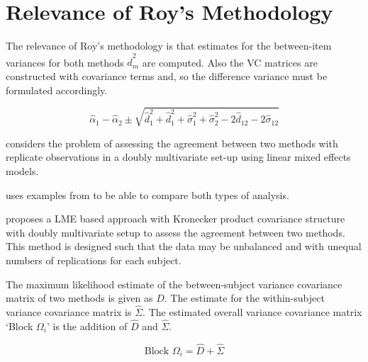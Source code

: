\documentclass[12pt, a4paper]{report}
\theoremstyle{plain}
\theoremstyle{definition}
\theoremstyle{remark}
\begin{document}










\section{Relevance of Roy's Methodology}

The relevance of Roy's methodology is that estimates for the between-item variances for both methods $\hat{d}^2_m$ are computed. Also the VC matrices are constructed with covariance
terms and, so the difference variance must be formulated accordingly.


\[
\hat{\alpha}_1 - \hat{\alpha}_2 \pm \sqrt{ \hat{d}^2_1  +
	\hat{d}^2_1 + \hat{\sigma}^2_1 + \hat{\sigma}^2_2 - 2 \hat{d}_{12}
	- 2 \hat{\sigma}_12}
\]




\citet{ARoy2009} considers the problem of assessing the agreement
between two methods with replicate observations in a doubly
multivariate set-up using linear mixed effects models.

\citet{ARoy2009} uses examples from \citet{BA86} to be able to
compare both types of analysis.

\citet{ARoy2009} proposes a LME based approach with Kronecker
product covariance structure with doubly multivariate setup to
assess the agreement between two methods. This method is designed
such that the data may be unbalanced and with unequal numbers of
replications for each subject.

The maximum likelihood estimate of the between-subject variance
covariance matrix of two methods is given as $D$. The estimate for
the within-subject variance covariance matrix is $\hat{\Sigma}$.
The estimated overall variance covariance matrix `Block
$\Omega_{i}$' is the addition of $\hat{D}$ and $\hat{\Sigma}$.


\begin{equation}
\mbox{Block  }\Omega_{i} = \hat{D} + \hat{\Sigma}
\end{equation}
\end{document}
